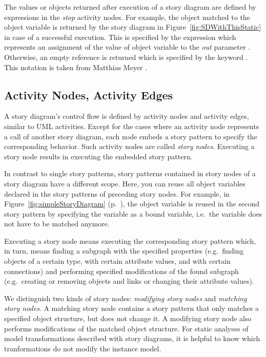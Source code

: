 The values or objects returned after execution of a story diagram are defined by expressions in the \emph{stop} activity nodes.
For example, the object matched to the object variable  is returned by the story diagram in Figure~\ref{fig:SDWithThisStatic} in case of a successful execution.
This is specified by the expression  which represents an assignment of the value of object variable  to the \emph{out} parameter .
Otherwise, an empty reference is returned which is specified by the keyword .
This notation is taken from Matthias Meyer \cite{Mey09}.

\subsection{Activity Nodes, Activity Edges} \label{sec:storydiagrams:activitynodes}

A story diagram's control flow is defined by activity nodes and activity edges, similar to UML activities.
Except for the cases where an activity node represents a call of another story diagram,
each node embeds a story pattern to specify the corresponding behavior.
Such activity nodes are called \emph{story nodes}.
Executing a story node results in executing the embedded story pattern.

In contrast to single story patterns, story patterns contained in story nodes of a story diagram have a different scope.
Here, you can reuse all object variables declared in the story patterns of preceding story nodes.
For example, in Figure~\ref{fig:simpleStoryDiagram} (p.~\pageref{fig:simpleStoryDiagram}),
the object variable  is reused in the second story pattern
by specifying the variable as a bound variable, i.e.\ the variable does not have to be matched anymore.

Executing a story node means executing the corresponding story pattern
which, in turn, means finding a subgraph with the specified properties
(e.g.\ finding objects of a certain type, with certain attribute values, and with certain connections)
and performing specified modifications of the found subgraph
(e.g.\ creating or removing objects and links or changing their attribute values).

We distinguish two kinds of story nodes: \emph{modifying story nodes} and \emph{matching story nodes}.
A matching story node contains a story pattern that only matches a specified object structure, but does not change it.
A modifying story node also performs modifications of the matched object structure.
For static analyses of model transformations described with story diagrams,
it is helpful to know which tranformations do not modify the instance model.


